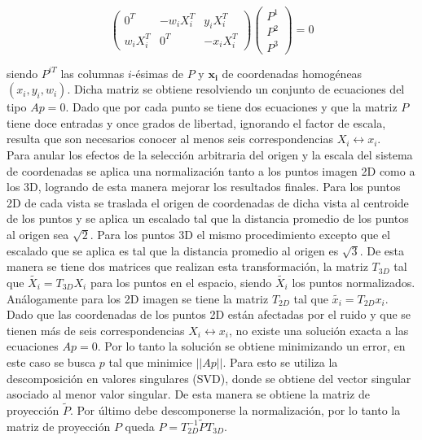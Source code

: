    \[
   \begin{pmatrix}
   0^T & -w_iX_i^T & y_iX_i^T \\
   w_iX_i^T & 0^T & -x_iX_i^T
   \end{pmatrix}
   \begin{pmatrix}
    P^1 \\
    P^2 \\
    P^3
   \end{pmatrix}
   = 0   
      \]
   
   
 \hspace{-0.6cm}siendo $P^{iT}$ las columnas $i$-ésimas de $P$ y $\mathbf{x_i}$ de coordenadas homogéneas $(x_i,y_i,w_i)$. Dicha matriz se obtiene resolviendo un conjunto de ecuaciones del tipo $Ap=0$.  Dado que por cada punto se tiene dos ecuaciones y que la matriz $P$ tiene doce entradas y once grados de libertad, ignorando el factor de escala, resulta que son necesarios conocer al menos seis correspondencias $X_i \leftrightarrow x_i$.\\
 
Para anular los efectos de la selección arbitraria del origen y la escala del sistema de coordenadas se aplica una normalización tanto a los puntos imagen 2D como a los 3D, logrando de esta manera mejorar los resultados finales. Para los puntos 2D de cada vista se traslada el origen de coordenadas de dicha vista al centroide de los puntos y se aplica un escalado tal que la distancia promedio de los puntos al origen sea $\sqrt{2}$. Para los puntos 3D el mismo procedimiento excepto que el escalado que se aplica es tal que la distancia promedio al origen es $\sqrt{3}$. De esta manera se tiene dos matrices que realizan esta transformación, la matriz $T_{3D}$ tal que $\tilde{X_i} = T_{3D}^{}X_i$ para los puntos en el espacio, siendo $\tilde{X_i}$ los puntos normalizados. Análogamente para los 2D imagen se tiene la matriz $T_{2D}^{}$ tal que $\tilde{x_i} = T_{2D}^{}x_i$. \\
 
 Dado que las coordenadas de los puntos 2D están afectadas por el ruido y que se tienen más de seis correspondencias $X_i \leftrightarrow x_i$, no existe una solución exacta a las ecuaciones $Ap=0$. Por lo tanto la solución se obtiene minimizando un error, en este caso se busca $p$ tal que minimice $||Ap||$. Para esto se utiliza la descomposición en valores singulares (SVD), donde se obtiene del vector singular asociado al menor valor singular. De esta manera se obtiene la matriz de proyección $\tilde{P}$. Por último debe descomponerse la normalización, por lo tanto la matriz de proyección $P$ queda $P = T_{2D}^{-1} \tilde{P} T_{3D}^{}$.
 
